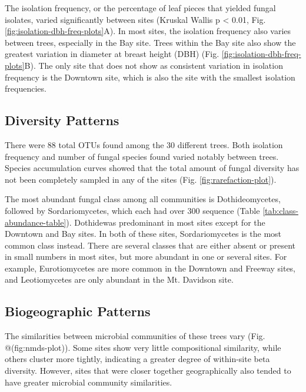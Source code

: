 \documentclass[fleqn,10pt,lineno]{wlpeerj} %
\begin{document}
The isolation frequency, or the percentage of leaf pieces that yielded fungal isolates, varied significantly between sites (Kruskal Wallis p \textless{} 0.01, Fig. \ref{fig:isolation-dbh-freq-plots}A). In most sites, the isolation frequency also varies between trees, especially in the Bay site. Trees within the Bay site also show the greatest variation in diameter at breast height (DBH) (Fig. \ref{fig:isolation-dbh-freq-plots}B). The only site that does not show as consistent variation in isolation frequency is the Downtown site, which is also the site with the smallest isolation frequencies.

\hypertarget{diversity-patterns}{%
\subsection*{Diversity Patterns}\label{diversity-patterns}}

There were 88 total OTUs found among the 30 different trees. Both isolation frequency and number of fungal species found varied notably between trees. Species accumulation curves showed that the total amount of fungal diversity has not been completely sampled in any of the sites (Fig. \ref{fig:rarefaction-plot}).

The most abundant fungal class among all communities is Dothideomycetes, followed by Sordariomycetes, which each had over 300 sequence (Table \ref{tab:class-abundance-table}). Dothidewas predominant in most sites except for the Downtown and Bay sites. In both of these sites, Sordariomycetes is the most common class instead. There are several classes that are either absent or present in small numbers in most sites, but more abundant in one or several sites. For example, Eurotiomycetes are more common in the Downtown and Freeway sites, and Leotiomycetes are only abundant in the Mt. Davidson site.

\hypertarget{biogeographic-patterns}{%
\subsection*{Biogeographic Patterns}\label{biogeographic-patterns}}

The similarities between microbial communities of these trees vary (Fig. @(fig:nmds-plot)). Some sites show very little compositional similarity, while others cluster more tightly, indicating a greater degree of within-site beta diversity. However, sites that were closer together geographically also tended to have greater microbial community similarities.
\end{document}

